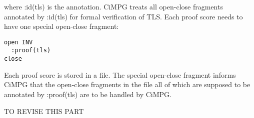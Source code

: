 \documentclass[a4paper,fleqn]{cas-dc}
\begin{document}
where :id(tls) is the annotation. CiMPG treats all open-close fragments annotated by :id(tls) for formal verification of TLS. Each proof score needs to have one special open-close fragment:
\begin{small}
\begin{verbatim}
open INV
  :proof(tls)
close
\end{verbatim}
\end{small}
Each proof score is stored in a file. The special open-close
fragment informs CiMPG that the open-close fragments in the file
all of which are supposed to be annotated by :proof(tls) are to
be handled by CiMPG.

TO REVISE THIS PART





\end{document}
